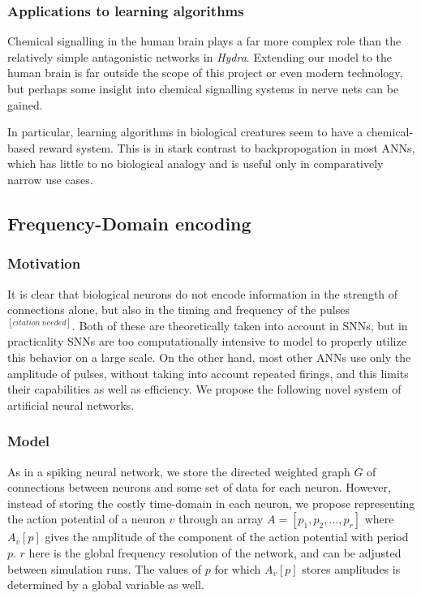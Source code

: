 \documentclass{article}
\begin{document}

\subsubsection{Applications to learning algorithms}

Chemical signalling in the human brain plays a far more complex role than the relatively simple antagonistic networks in \textit{Hydra}. Extending our model to the human brain is far outside the scope of this project or even modern technology, but perhaps some insight into chemical signalling systems in nerve nets can be gained.

In particular, learning algorithms in biological creatures seem to have a chemical-based reward system. This is in stark contrast to backpropogation in most ANNs, which has little to no biological analogy and is useful only in comparatively narrow use cases.


\subsection{Frequency-Domain encoding}

\subsubsection{Motivation}

It is clear that biological neurons do not encode information in the strength of connections alone, but also in the timing and frequency of the pulses $^{[citation \ needed]}$. Both of these are theoretically taken into account in SNNs, but in practicality SNNs are too computationally intensive to model to properly utilize this behavior on a large scale. On the other hand, most other ANNs use only the amplitude of pulses, without taking into account repeated firings, and this limits their capabilities as well as efficiency. We propose the following novel system of artificial neural networks.

\subsubsection{Model}

As in a spiking neural network, we store the directed weighted graph $G$ of connections between neurons and some set of data for each neuron. However, instead of storing the costly time-domain in each neuron, we propose representing the action potential of a neuron $v$ through an array $A = [p_1, p_2, \ldots, p_r]$ where $A_v[p]$ gives the amplitude of the component of the action potential with period $p$. $r$ here is the global frequency resolution of the network, and can be adjusted between simulation runs. The values of $p$ for which $A_v[p]$ stores amplitudes is determined by a global variable as well. 
\end{document}
